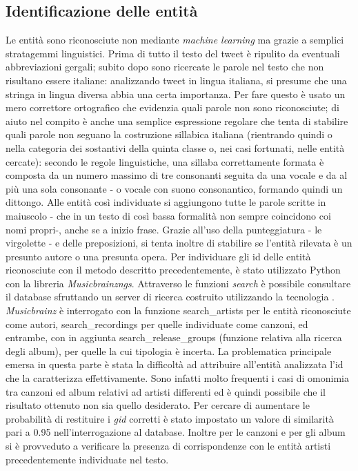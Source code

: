 \documentclass[12pt, a4paper, twocolumn]{article} %
\begin{document}
\subsection{Identificazione delle entità}
Le entità sono riconosciute non mediante \textit{machine learning} ma grazie a semplici stratagemmi linguistici.
Prima di tutto il testo del tweet è ripulito da eventuali abbreviazioni gergali; subito dopo sono ricercate le parole nel testo che non risultano essere italiane: analizzando tweet in lingua italiana, si presume che una stringa in lingua diversa abbia una certa importanza.
Per fare questo è usato un mero correttore ortografico che evidenzia quali parole non sono riconosciute; di aiuto nel compito è anche una semplice espressione regolare che tenta di stabilire quali parole non seguano la costruzione sillabica italiana (rientrando quindi o nella categoria dei sostantivi della quinta classe o, nei casi fortunati, nelle entità cercate): secondo le regole linguistiche, una sillaba correttamente formata è composta da un numero massimo di tre consonanti seguita da una vocale e da al più una sola consonante - o vocale con suono consonantico, formando quindi un dittongo.
Alle entità così individuate si aggiungono tutte le parole scritte in maiuscolo - che in un testo di così bassa formalità non sempre coincidono coi nomi propri-, anche se a inizio frase.
Grazie all'uso della punteggiatura - le virgolette - e delle preposizioni, si tenta inoltre di stabilire se l'entità rilevata è un presunto autore o una presunta opera.
Per individuare gli id delle entità riconosciute con il metodo descritto precedentemente, è stato utilizzato Python con la libreria \textit{Musicbrainzngs}.
Attraverso le funzioni \textit{search} è possibile consultare il database sfruttando un server di ricerca costruito utilizzando la tecnologia .
\textit{Musicbrainz} è interrogato con la funzione search\_artists per le entità riconosciute come autori, search\_recordings per quelle individuate come canzoni, ed entrambe, con in aggiunta search\_release\_groups (funzione relativa alla ricerca degli album), per quelle la cui tipologia è incerta.
La problematica principale emersa in questa parte è stata la difficoltà ad attribuire all’entità analizzata l’id che la caratterizza effettivamente.
Sono infatti molto frequenti i casi di omonimia tra canzoni ed album relativi ad artisti differenti ed è quindi possibile che il risultato ottenuto non sia quello desiderato.
Per cercare di aumentare le probabilità di restituire i \textit{gid} corretti è stato impostato un valore di similarità pari a 0.95 nell’interrogazione al database. Inoltre per le canzoni e per gli album si è provveduto a verificare la presenza di corrispondenze con le entità artisti precedentemente individuate nel testo.
\end{document}
